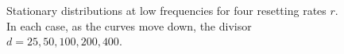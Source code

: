 \documentclass[a4paper,12pt,reqno,superscriptaddress,nofootinbib]{revtex4}
\theoremstyle{plain}
\theoremstyle{definition}
\theoremstyle{remark}
\newcommand{\0}{^{(0)}}
\newcommand{\1}{^{(1)}}
\newcommand{\2}{^{(2)}}
\begin{document}
\begin{figure}
	\hfill%
	\hfill%
	\caption{Stationary distributions at low frequencies for four resetting rates $r$.  In each case, as the curves move down, the divisor $d =25, 50, 100, 200, 400$.}\label{fig:exploration}
\end{figure}
\end{document}
